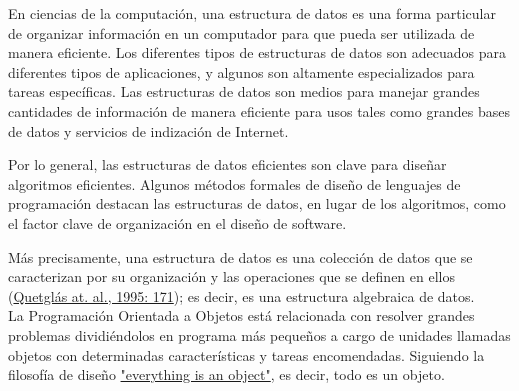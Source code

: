 En ciencias de la computación, una estructura de datos es una forma particular de organizar información en un computador para que pueda ser utilizada de manera eficiente.  Los diferentes tipos de estructuras de datos son adecuados para diferentes tipos de aplicaciones, y algunos son altamente especializados para tareas específicas.
Las estructuras de datos son medios para manejar grandes cantidades de información de manera eficiente para usos tales como grandes bases de datos y servicios de indización de Internet. 

Por lo general, las estructuras de datos eficientes son clave para diseñar algoritmos eficientes. Algunos métodos formales de diseño de lenguajes de programación destacan las estructuras de datos, en lugar de los algoritmos, como el factor clave de organización en el diseño de software. 

Más precisamente, una estructura de datos es una colección de datos que se caracterizan por su organización y las operaciones que se definen en ellos   (\href{https://editorial.uader.edu.ar/wp-content/uploads/2021/04/Algoritmos%20y%20estructuras%20de%20datos%20en%20Python%20-%20digital.pdf}{\color{vino}Quetglás at. al., 1995: 171}); es decir, es una estructura algebraica de datos.\\






La Programación Orientada a Objetos está relacionada con resolver grandes problemas dividiéndolos en programa más pequeños a cargo de unidades llamadas objetos con determinadas características y tareas encomendadas. Siguiendo la filosofía de diseño \href{https://www.ionos.es/digitalguide/paginas-web/desarrollo-web/python-oop/}{\color{vino}  "everything is an object"}, es decir, todo es un objeto.\\

